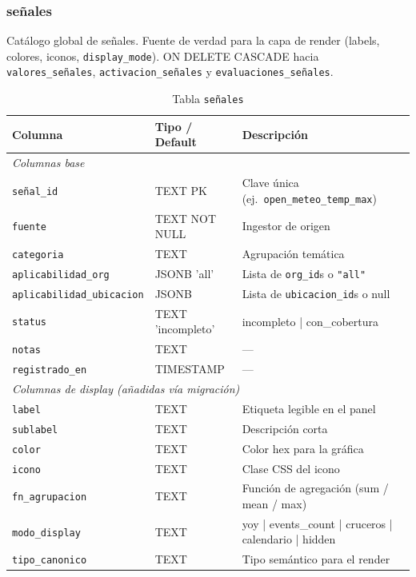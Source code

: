 \documentclass[12pt, a4paper]{article}
\begin{document}
\subsubsection{señales}

Catálogo global de señales. Fuente de verdad para la capa de render (labels, colores, iconos, \texttt{display\_mode}). ON DELETE CASCADE hacia \texttt{valores\_señales}, \texttt{activacion\_señales} y \texttt{evaluaciones\_señales}.

\begin{table}[H]
\centering
\renewcommand{\arraystretch}{1.2}
\begin{tabular}{llp{5.5cm}}
\toprule
\textbf{Columna} & \textbf{Tipo / Default} & \textbf{Descripción} \\
\midrule
\multicolumn{3}{l}{\textit{Columnas base}} \\
\texttt{señal\_id}               & TEXT PK             & Clave única (ej.\ \texttt{open\_meteo\_temp\_max}) \\
\texttt{fuente}                  & TEXT NOT NULL       & Ingestor de origen \\
\texttt{categoria}               & TEXT                & Agrupación temática \\
\texttt{aplicabilidad\_org}      & JSONB 'all'       & Lista de \texttt{org\_id}s o \texttt{"all"} \\
\texttt{aplicabilidad\_ubicacion} & JSONB             & Lista de \texttt{ubicacion\_id}s o null \\
\texttt{status}                  & TEXT 'incompleto'   & incompleto | con\_cobertura \\
\texttt{notas}                   & TEXT                & — \\
\texttt{registrado\_en}          & TIMESTAMP           & — \\
\midrule
\multicolumn{3}{l}{\textit{Columnas de display (añadidas vía migración)}} \\
\texttt{label}         & TEXT & Etiqueta legible en el panel \\
\texttt{sublabel}      & TEXT & Descripción corta \\
\texttt{color}         & TEXT & Color hex para la gráfica \\
\texttt{icono}         & TEXT & Clase CSS del icono \\
\texttt{fn\_agrupacion} & TEXT & Función de agregación (sum / mean / max) \\
\texttt{modo\_display} & TEXT & yoy | events\_count | cruceros | calendario | hidden \\
\texttt{tipo\_canonico} & TEXT & Tipo semántico para el render \\
\bottomrule
\end{tabular}
\caption{Tabla \texttt{señales}}
\end{table}
\end{document}
